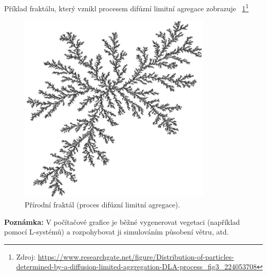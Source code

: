 \documentclass[thesis=B, czech]{FITthesis}[2019/03/06]
\newcommand{\note}[1]{\begin{noteBox} \textbf{Poznámka:} #1 \end{noteBox}}
\begin{document}
Příklad fraktálu, který vznikl procesem difúzní limitní agregace zobrazuje \figurename~\ref{fig:dla}\footnote{Zdroj: \url{https://www.researchgate.net/figure/Distribution-of-particles-determined-by-a-diffusion-limited-aggregation-DLA-process_fig3_224053708}}

\begin{figure}[h]
    \centering
    \includegraphics[width=260pt]{images/dla.png}
        \caption{Přírodní fraktál (proces difúzní limitní agregace).}
        \label{fig:dla}
\end{figure}


\note{V počítačové grafice je běžné vygenerovat vegetaci (například pomocí L-systémů) a rozpohybovat ji simulováním působení větru, atd.}

\newpage





\end{document}
